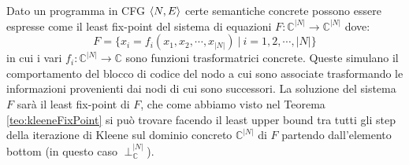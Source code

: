 Dato un programma in CFG \(\langle N, E\rangle\) certe semantiche concrete possono essere espresse come il least fix-point del sistema di equazioni \(F:\mathbb{C}^{|N|}\rightarrow\mathbb{C}^{|N|}\) dove:
\[F = \{x_i = f_i(x_1, x_2, \cdots, x_{|N|})\ |\ i=1, 2,\cdots, |N|\}\]
in cui i vari \(f_i:\mathbb{C}^{|N|}\rightarrow\mathbb{C}\) sono funzioni trasformatrici concrete. Queste simulano il comportamento del blocco di codice del nodo a cui sono associate trasformando le informazioni provenienti dai nodi di cui sono successori. La soluzione del sistema \(F\) sarà il least fix-point di \(F\), che come abbiamo visto nel Teorema \ref{teo:kleeneFixPoint} si può trovare  facendo il least upper bound tra tutti gli step della iterazione di Kleene sul dominio concreto \(\mathbb{C}^{|N|}\) di \(F\) partendo dall'elemento bottom (in questo caso \(\perp_{\mathbb{C}}^{|N|}\)).

